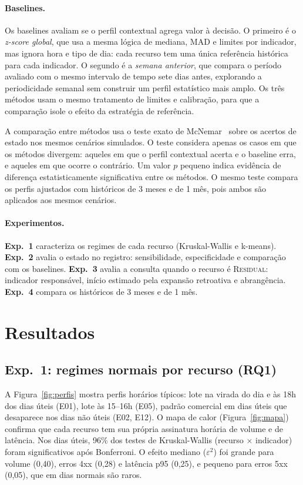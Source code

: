 \documentclass[sigconf,nonacm]{acmart}
\newcommand{\Residual}{\textsc{Residual}\xspace}
\begin{document}
\paragraph{Baselines.} Os baselines avaliam se o perfil contextual agrega valor à decisão. O primeiro é o \emph{z-score global}, que usa a mesma lógica de mediana, MAD e limites por indicador, mas ignora hora e tipo de dia: cada recurso tem uma única referência histórica para cada indicador. O segundo é a \emph{semana anterior}, que compara o período avaliado com o mesmo intervalo de tempo sete dias antes, explorando a periodicidade semanal sem construir um perfil estatístico mais amplo. Os três métodos usam o mesmo tratamento de limites e calibração, para que a comparação isole o efeito da estratégia de referência.

A comparação entre métodos usa o teste exato de McNemar~\citep{mcnemar1947note} sobre os acertos de estado nos mesmos cenários simulados. O teste considera apenas os casos em que os métodos divergem: aqueles em que o perfil contextual acerta e o baseline erra, e aqueles em que ocorre o contrário. Um valor $p$ pequeno indica evidência de diferença estatisticamente significativa entre os métodos. O mesmo teste compara os perfis ajustados com históricos de 3 meses e de 1 mês, pois ambos são aplicados aos mesmos cenários.

\paragraph{Experimentos.} \textbf{Exp.~1} caracteriza os regimes de cada recurso (Kruskal-Wallis e k-means). \textbf{Exp.~2} avalia o estado no registro: sensibilidade, especificidade e comparação com os baselines. \textbf{Exp.~3} avalia a consulta quando o recurso é \Residual: indicador responsável, início estimado pela expansão retroativa e abrangência. \textbf{Exp.~4} compara os históricos de 3 meses e de 1 mês.

\section{Resultados}\label{sec:resultados}

\subsection{Exp.~1: regimes normais por recurso (RQ1)}

A Figura~\ref{fig:perfis} mostra perfis horários típicos: lote na virada do dia e às 18h dos dias úteis (E01), lote às 15--16h (E05), padrão comercial em dias úteis que desaparece nos dias não úteis (E02, E12). O mapa de calor (Figura~\ref{fig:mapa}) confirma que cada recurso tem sua própria assinatura horária de volume e de latência. Nos dias úteis, 96\% dos testes de Kruskal-Wallis (recurso $\times$ indicador) foram significativos após Bonferroni. O efeito mediano ($\varepsilon^2$) foi grande para volume (0,40), erros 4xx (0,28) e latência p95 (0,25), e pequeno para erros 5xx (0,05), que em dias normais são raros.
\end{document}

